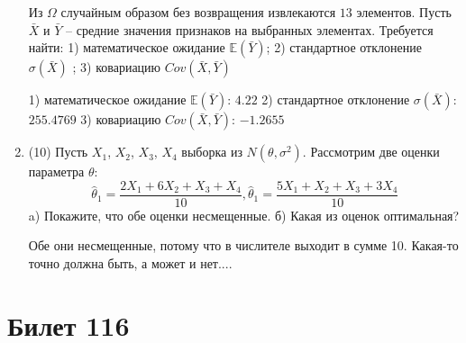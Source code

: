 \documentclass[a4paper,12pt]{article}
\begin{document}
\begin{enumerate}
Из $\Omega$ случайным образом без возвращения извлекаются $13$ элементов. 
Пусть $\bar X$ и $\bar Y$ – средние значения признаков на выбранных элементах. 
Требуется найти: 1) математическое ожидание $\mathbb{E}(\bar Y)$; 2) стандартное отклонение $\sigma(\bar X)$ ; 
3) ковариацию $Cov(\bar X, \bar Y)$




1) математическое ожидание $\mathbb{E}(\bar Y)$: $4.22$ 
2) стандартное отклонение $\sigma(\bar X)$: $255.4769$
3) ковариацию $Cov(\bar X, \bar Y)$: $-1.2655$


\item


(10) Пусть $X _{1}$, $X _{2}$, $X _{3}$, $X _{4}$ выборка из $N(\theta, \sigma ^{2})$. Рассмотрим две оценки параметра $\theta$:
\[\hat \theta _{1} = \frac{2X _{1} + 6X _{2} + X _{3} + X _{4}}{10}, \hat \theta _{1} = \frac{5X _{1} + X _{2} + X _{3} + 3X _{4}}{10}\]
a) Покажите, что обе оценки несмещенные.
б) Какая из оценок оптимальная?




Обе они несмещенные, потому что в числителе выходит в сумме 10.
Какая-то точно должна быть, а может и нет....



\end{enumerate}

\section{Билет 116}
\end{document}

